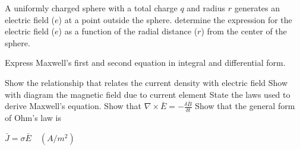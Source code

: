 \begin{mdframed}[backgroundcolor=lightblue, linewidth=1pt, hidealllines=true]
\begin{ExerciseList}
\Exercise[label={ex4}] A uniformly charged sphere with a total charge \(q\) and radius \(r\) generates an electric field (\(e\)) at a point outside the sphere. determine the expression for the electric field (\(e\)) as a function of the radial distance (\(r\)) from the center of the sphere.

\Exercise[label={ex5}] Express Maxwell's first and second equation in integral and differential form.

\Exercise[label={ex6}] Show the relationship that relates the current density with electric field
\Exercise[label={ex7}] Show with diagram the magnetic field due to current element 
\Exercise[label={ex8}] State the laws used to derive Maxwell's equation.
\Exercise[label={ex9}] Show that $\nabla \times \bar{E} = -\frac{\delta \bar{B}}{\delta t}$
\Exercise[label={ex10}] Show that the general form of Ohm's law is 

$\bar{J} = \sigma\bar{E}\quad (A/m^{2})$


\end{ExerciseList}
\end{mdframed}